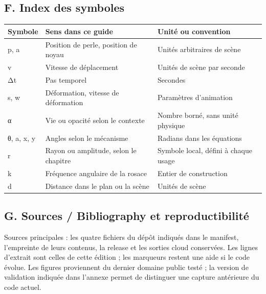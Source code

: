 \documentclass[
  canadien,
  11pt,
  letterpaper,
]{article}
\newcounter{none} %
\begin{document}
\subsection{F. Index des symboles}\label{f.-index-des-symboles}

{\def\LTcaptype{none} %
\begin{longtable}[]{@{}
  >{\raggedright\arraybackslash}p{}
  >{\raggedright\arraybackslash}p{}
  >{\raggedright\arraybackslash}p{}@{}}
\toprule\noalign{}
\begin{minipage}[b]{\linewidth}\raggedright
Symbole
\end{minipage} & \begin{minipage}[b]{\linewidth}\raggedright
Sens dans ce guide
\end{minipage} & \begin{minipage}[b]{\linewidth}\raggedright
Unité ou convention
\end{minipage} \\
\midrule\noalign{}
\endhead
\bottomrule\noalign{}
\endlastfoot
p, a & Position de perle, position de noyau & Unités arbitraires de
scène \\
v & Vitesse de déplacement & Unités de scène par seconde \\
Δt & Pas temporel & Secondes \\
s, w & Déformation, vitesse de déformation & Paramètres d'animation \\
α & Vie ou opacité selon le contexte & Nombre borné, sans unité
physique \\
θ, a, x, y & Angles selon le mécanisme & Radians dans les équations \\
r & Rayon ou amplitude, selon le chapitre & Symbole local, défini à
chaque usage \\
k & Fréquence angulaire de la rosace & Entier de construction \\
d & Distance dans le plan ou la scène & Unités de scène \\
\end{longtable}
}

\subsection{G. Sources / Bibliography et
reproductibilité}\label{g.-sources-bibliography-et-reproductibilituxe9}

Sources principales : les quatre fichiers du dépôt indiqués dans le
manifest, l'empreinte de leurs contenus, la release et les sorties cloud
conservées. Les lignes d'extrait sont celles de cette édition ; les
marqueurs restent une aide si le code évolue. Les figures proviennent du
dernier domaine public testé ; la version de validation indiquée dans
l'annexe permet de distinguer une capture antérieure du code actuel.
\end{document}
